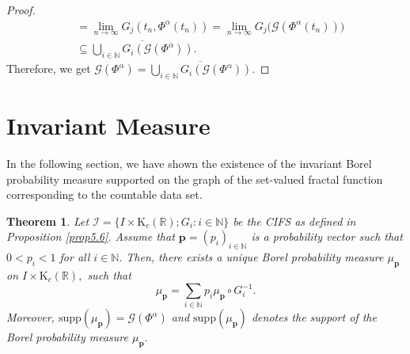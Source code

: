 \documentclass[12pt,oneside,reqno]{amsart}
\newtheorem{theorem}{Theorem}[section]
\theoremstyle{definition}
\theoremstyle{remark}
\begin{document}
\begin{proof}
\begin{equation*}
\begin{aligned}
                  &=\underset{n\rightarrow \infty}{\lim}G_j(t_n,\Phi^\alpha(t_n)) =\underset{n\rightarrow \infty}{\lim} G_j\big(\mathcal{G}(\Phi^\alpha(t_n))\big) \\
                  &\subseteq \overline{ \underset{i\in \mathbb{N}}{\bigcup}G_i(\mathcal{G}(\Phi^\alpha))}.
              \end{aligned}
          \end{equation*}
          Therefore, we get
          $\mathcal{G}(\Phi^\alpha )=\overline{ \underset{i\in \mathbb{N}}{\bigcup}G_i(\mathcal{G}(\Phi^\alpha))}.$
     \end{proof}
  \section{Invariant Measure }
         In the following section, we have shown the existence of the invariant Borel probability measure supported on the graph of the set-valued fractal function corresponding to the countable data set.
 \begin{theorem}
  Let $\mathcal{I}=\{I\times \mathrm{K}_c(\mathbb{R});G_i:i\in \mathbb{N}\}$ be the CIFS as defined in Proposition \ref{prop5.6}. Assume that $\boldsymbol{p}=(p_{i})_{i\in \mathbb{N}}$ is a probability vector such that $0<p_{i}<1$ for all $i \in\mathbb{N}.$  Then, there exists a unique Borel probability measure $\mu_{\boldsymbol{p}}$ on $I\times \mathrm{K}_c(\mathbb{R}),$ such that
$$\mu_{\boldsymbol{p}}=\sum_{i \in\mathbb{N}}p_{i}\mu_{\boldsymbol{p}}\circ G_{i}^{-1}.$$
Moreover, $\text{supp}(\mu_{\boldsymbol{p}})=\mathcal{G}(\Phi^\alpha)$ and $\text{supp}(\mu_{\boldsymbol{p}})$ denotes the support of the Borel probability measure $\mu_{\boldsymbol{p}}.$
\end{theorem}
\end{document}
